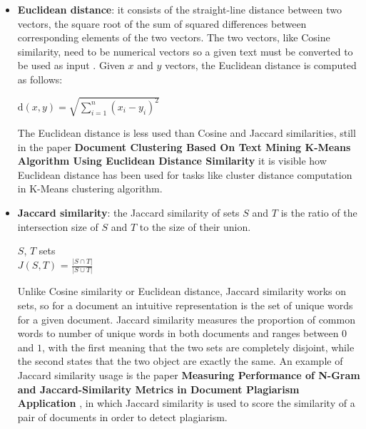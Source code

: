 \documentclass[\main/main.tex]{subfiles}
\begin{document}
\begin{itemize}
\begin{itemize}
    \end{itemize}
    \item \textbf{Euclidean distance}: it consists of the straight-line distance between two vectors, the square root of the sum of squared differences between corresponding elements of the two vectors. The two vectors, like Cosine similarity, need to be numerical vectors so a given text must be converted to be used as input \cite{Gomaa2013ASO}. Given $x$ and $y$ vectors, the Euclidean distance is computed as follows:
    \begin{center}
        $\mathrm{d}(x, y) = \sqrt{\sum\limits_{i=1}^n (x_i-y_i)^2}$
    \end{center}
    The Euclidean distance is less used than Cosine and Jaccard similarities, still in the paper \textbf{Document Clustering Based On Text Mining K-Means Algorithm Using Euclidean Distance Similarity} \cite{Lydia2018DocumentCB} it is visible how Euclidean distance has been used for tasks like cluster distance computation in K-Means clustering algorithm.
    \item \textbf{Jaccard similarity}: the Jaccard similarity \cite{leskovec_rajaraman_ullman_2020}\cite{Gomaa2013ASO} of sets $S$ and $T$ is  the ratio of the intersection size of $S$ and $T$ to the size of their union.\\
    \begin{center}
        $S$, $T$ sets\\
        $J(S, T)$ = $\frac{| S \cap T|}{|S \cup T|}$
    \end{center}
    Unlike Cosine similarity or Euclidean distance, Jaccard similarity works on sets, so for a document an intuitive representation is the set of unique words for a given document. Jaccard similarity measures the proportion of common words to number of unique words in both documents and ranges between $0$ and $1$, with the first meaning that the two sets are completely disjoint, while the second states that the two object are exactly the same. An example of Jaccard similarity usage is the paper \textbf{Measuring Performance of N-Gram and Jaccard-Similarity Metrics in Document Plagiarism Application} \cite{Eka_Diana_2019}, in which Jaccard similarity is used to score the similarity of a pair of documents in order to detect plagiarism.
\end{itemize}
\end{document}
